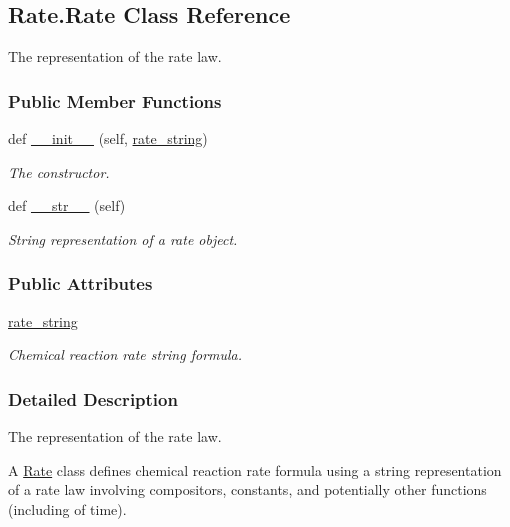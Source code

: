 \hypertarget{classRate_1_1Rate}{}\subsection{Rate.\+Rate Class Reference}
\label{classRate_1_1Rate}


The representation of the rate law.  


\subsubsection*{Public Member Functions}
\begin{DoxyCompactItemize}
\item 
def \hyperlink{classRate_1_1Rate_a5f936ae17f564e43858776e77a5995a0}{\+\_\+\+\_\+init\+\_\+\+\_\+} (self, \hyperlink{classRate_1_1Rate_ae2f23006afbfa7ac885215361e3c4f49}{rate\+\_\+string})
\begin{DoxyCompactList}\small\item\em The constructor. \end{DoxyCompactList}\item 
def \hyperlink{classRate_1_1Rate_ab7a0d1396264b888fb0b91f071d22168}{\+\_\+\+\_\+str\+\_\+\+\_\+} (self)
\begin{DoxyCompactList}\small\item\em String representation of a rate object. \end{DoxyCompactList}\end{DoxyCompactItemize}
\subsubsection*{Public Attributes}
\begin{DoxyCompactItemize}
\item 
\hyperlink{classRate_1_1Rate_ae2f23006afbfa7ac885215361e3c4f49}{rate\+\_\+string}
\begin{DoxyCompactList}\small\item\em Chemical reaction rate string formula. \end{DoxyCompactList}\end{DoxyCompactItemize}


\subsubsection{Detailed Description}
The representation of the rate law. 

A \hyperlink{classRate_1_1Rate}{Rate} class defines chemical reaction rate formula using a string representation of a rate law involving compositors, constants, and potentially other functions (including of time).

